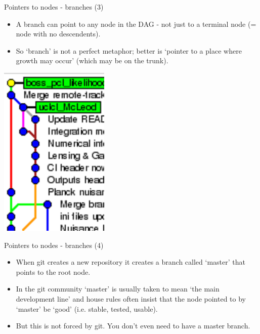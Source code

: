 \documentclass[usenames,dvipsnames]{beamer}
\begin{document}
\begin{frame}{Pointers to nodes - branches (3)}
  \begin{block}{}
    \begin{itemize}
      \item{A branch can point to any node in the DAG - not just to a terminal node (= node with no descendents).}
      \item{So `branch' is not a perfect metaphor; better is `pointer to a place where growth may occur' (which may be on the trunk).}
    \end{itemize}
  \end{block}
  \begin{block}{}
    \begin{center}
      \includegraphics[scale=0.4]{Branch_3.png}
    \end{center}
  \end{block}
\end{frame}

\begin{frame}{Pointers to nodes - branches (4)}
  \begin{block}{}
    \begin{itemize}
      \item{When git creates a new repository it creates a branch called `master' that points to the root node.}
      \item{In the git community `master' is usually taken to mean `the main development line' and house rules often insist that the node pointed to by `master' be `good' (i.e. stable, tested, usable).}
      \item{But this is not forced by git. You don't even need to have a master branch.}
    \end{itemize}
  \end{block}
\end{frame}
\end{document}

